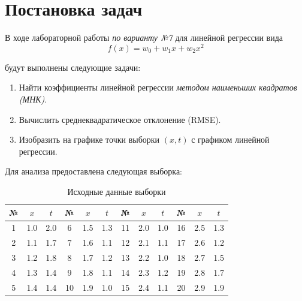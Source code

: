 \section{Постановка задач}

В ходе лабораторной работы \textit{по варианту №7} для линейной регрессии вида 
\[
    f(x) = w_0 + w_1 x + w_2 x^2
\]

будут выполнены следующие задачи:

\begin{enumerate}
  \item Найти коэффициенты линейной регрессии \textit{методом наименьших квадратов (МНК)}.
  \item Вычислить среднеквадратическое отклонение (RMSE).
  \item Изобразить на графике точки выборки $(x, t)$ с графиком линейной регрессии.
\end{enumerate}

Для анализа предоставлена следующая выборка:

\begin{table}[h!]
\centering
\begin{tabular}{|c|c|c||c|c|c||c|c|c||c|c|c|}
\hline
№ & $x$ & $t$ & № & $x$ & $t$ & № & $x$ & $t$ & № & $x$ & $t$ \\ \hline \hline
1 & 1.0 & 2.0 & 6 & 1.5 & 1.3 & 11 & 2.0 & 1.0 & 16 & 2.5 & 1.3 \\ \hline
2 & 1.1 & 1.7 & 7 & 1.6 & 1.1 & 12 & 2.1 & 1.1 & 17 & 2.6 & 1.2 \\ \hline
3 & 1.2 & 1.8 & 8 & 1.7 & 1.2 & 13 & 2.2 & 1.0 & 18 & 2.7 & 1.5 \\ \hline
4 & 1.3 & 1.4 & 9 & 1.8 & 1.1 & 14 & 2.3 & 1.2 & 19 & 2.8 & 1.7 \\ \hline
5 & 1.4 & 1.4 & 10 & 1.9 & 1.0 & 15 & 2.4 & 1.1 & 20 & 2.9 & 1.9 \\ \hline
\end{tabular}
\caption{Исходные данные выборки}
\end{table}